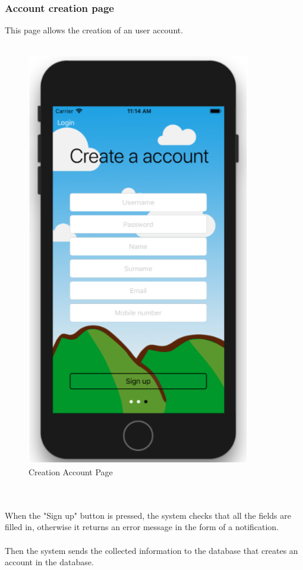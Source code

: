 \subsubsection{Account creation page}

This page allows the creation of an user account.
\\\\
\begin{figure}[h!]
\begin{center}
\includegraphics[scale = 0.3]{diagrams/AccountCreationPage.png} 
\end{center}
\caption{Creation Account Page}
\end{figure}
\\\\
When the "Sign up" button is pressed, the system checks that all the fields are filled in, otherwise it returns an error message in the form of a notification.
\\\\
Then the system sends the collected information to the database that creates an account in the database.

